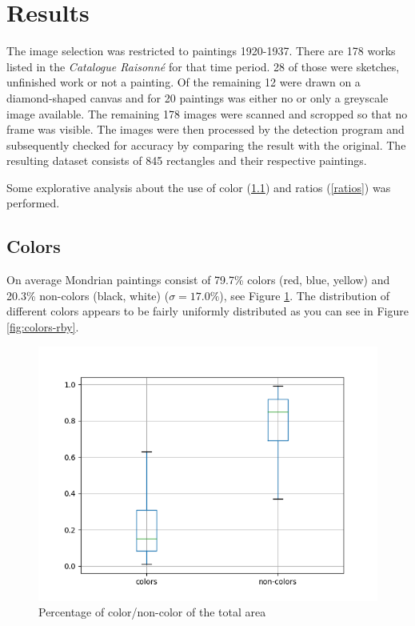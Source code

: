 \section{Results} \label{results}

 The image selection was restricted to paintings 1920-1937. There are 178 works
listed in the \textit{Catalogue Raisonn{\'e}} \cite{joosten1998} for that time
period. 28 of those were sketches, unfinished work or not a painting. Of the
remaining 12 were drawn on a diamond-shaped canvas and for 20 paintings was
either no or only a greyscale image available. The remaining 178 images were
scanned and scropped so that no frame was visible. The images were then
processed by the detection program and subsequently checked for accuracy by
comparing the result with the original. The resulting dataset consists of 845
rectangles and their respective paintings.

Some explorative analysis about the use of color (\ref{color}) and ratios
(\ref{ratios}) was performed.

\subsection{Colors} \label{color}

On average Mondrian paintings consist of 79.7\% colors (red, blue, yellow) and
20.3\% non-colors (black, white) ($\sigma = 17.0\%$), see Figure
\ref{fig:colors-noncolors}. The distribution of different colors appears to be
fairly uniformly distributed as you can see in Figure \ref{fig:colors-rby}.

\begin{figure}
\includegraphics[width=\linewidth]{images/colors-non-colors.png}
\caption{Percentage of color/non-color of the total area}
\label{fig:colors-noncolors}
\end{figure}

